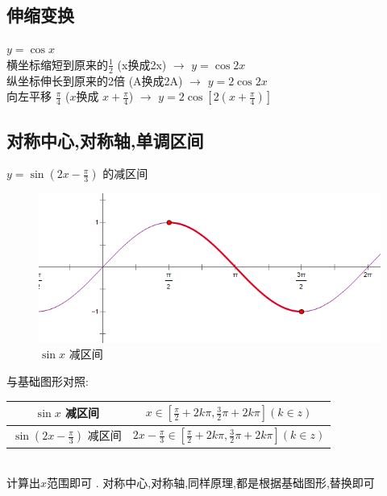 \documentclass[hyperref, UTF8,11pt,a4paper]{ctexart} %
\begin{document}

\subsection {伸缩变换}
$y = \cos x$ \\
横坐标缩短到原来的$ \frac{1}{2} $ (x换成2x) $\longrightarrow$ $y= \cos 2x$ \\
纵坐标伸长到原来的2倍 (A换成2A) $\longrightarrow$ $y=  2 \cos 2x$ \\
向左平移 $\frac {\pi}{4} $  ($x$换成 $x+\frac{\pi}{4}$) $\longrightarrow$ $y=2 \cos \left[2\left(x+\frac{\pi}{4}\right)\right]$

\subsection {对称中心,对称轴,单调区间}

{\color{red}  $y=\sin \left(2 x-\frac{\pi}{3}\right)$ 的减区间} \\
\begin{figure}[h] %
	\begin{center}
		\includegraphics[scale=0.3]  {pic/sanjiaohanshu/dandiaojianqujian.png}
		\caption{$\sin x$ 减区间}
	\end{center}
\end{figure}


与基础图形对照:
\begin{tabular}{|c|c|}
	\hline
	$\sin x$ 减区间                              & $x \in\left[\frac{\pi}{2}+2 k \pi, \frac{3}{2} \pi+2 k \pi\right](k \in z)$                 \\
	\hline
	$\sin \left(2 x-\frac{\pi}{3}\right)$ 减区间 & $2 x-\frac{\pi}{3} \in\left[\frac{\pi}{2}+2 k \pi, \frac{3}{2} \pi+2 k \pi\right](k \in z)$ \\
	\hline
\end{tabular} \\
计算出$x$范围即可 . {\color{red}  对称中心,对称轴,同样原理,都是根据基础图形,替换即可}
\end{document}
